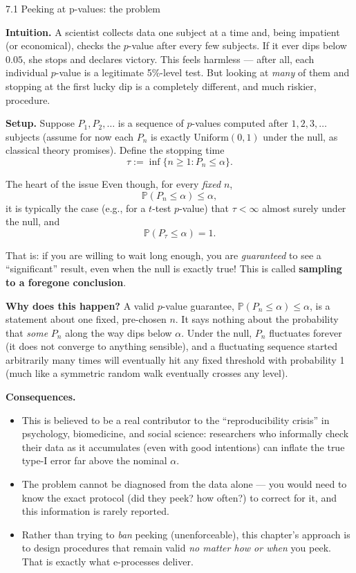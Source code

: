 \documentclass[aspectratio=169,10pt]{beamer}
\begin{document}
\begin{frame}[allowframebreaks]{7.1 Peeking at p-values: the problem}

\textbf{Intuition.} A scientist collects data one subject at a time and, being impatient (or economical), checks
the $p$-value after every few subjects. If it ever dips below $0.05$, she stops and declares victory. This feels
harmless --- after all, each individual $p$-value is a legitimate 5\%-level test. But looking at \emph{many} of them
and stopping at the first lucky dip is a completely different, and much riskier, procedure.

\vspace{0.2cm}
\textbf{Setup.} Suppose $P_1, P_2, \dots$ is a sequence of $p$-values computed after $1, 2, 3, \dots$ subjects
(assume for now each $P_n$ is exactly $\text{Uniform}(0,1)$ under the null, as classical theory promises). Define
the stopping time
$$\tau := \inf\{n \ge 1 : P_n \le \alpha\}.$$

\begin{block}{The heart of the issue}
Even though, for every \emph{fixed} $n$,
$$\mathbb{P}(P_n \le \alpha) \le \alpha,$$
it is typically the case (e.g., for a $t$-test $p$-value) that $\tau < \infty$ almost surely under the null, and
$$\mathbb{P}(P_\tau \le \alpha) = 1.$$
\end{block}

That is: if you are willing to wait long enough, you are \emph{guaranteed} to see a ``significant'' result, even
when the null is exactly true! This is called \textbf{sampling to a foregone conclusion}.

\framebreak

\textbf{Why does this happen?} A valid $p$-value guarantee, $\mathbb{P}(P_n \le \alpha) \le \alpha$, is a statement
about one fixed, pre-chosen $n$. It says nothing about the probability that \emph{some} $P_n$ along the way dips
below $\alpha$. Under the null, $P_n$ fluctuates forever (it does not converge to anything sensible), and a
fluctuating sequence started arbitrarily many times will eventually hit any fixed threshold with probability 1
(much like a symmetric random walk eventually crosses any level).

\textbf{Consequences.}
\begin{itemize}
\item This is believed to be a real contributor to the ``reproducibility crisis'' in psychology, biomedicine, and
social science: researchers who informally check their data as it accumulates (even with good intentions) can
inflate the true type-I error far above the nominal $\alpha$.
\item The problem cannot be diagnosed from the data alone --- you would need to know the exact protocol
(did they peek? how often?) to correct for it, and this information is rarely reported.
\item Rather than trying to \emph{ban} peeking (unenforceable), this chapter's approach is to design procedures
that remain valid \emph{no matter how or when} you peek. That is exactly what e-processes deliver.
\end{itemize}

\end{frame}
\end{document}
